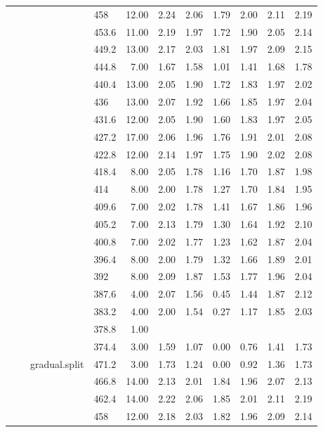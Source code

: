 \begin{longtable}{llllrrrrrrr}
   &  &  & 458 & 12.00 & 2.24 & 2.06 & 1.79 & 2.00 & 2.11 & 2.19 \\ 
   &  &  & 453.6 & 11.00 & 2.19 & 1.97 & 1.72 & 1.90 & 2.05 & 2.14 \\ 
   &  &  & 449.2 & 13.00 & 2.17 & 2.03 & 1.81 & 1.97 & 2.09 & 2.15 \\ 
   &  &  & 444.8 & 7.00 & 1.67 & 1.58 & 1.01 & 1.41 & 1.68 & 1.78 \\ 
   &  &  & 440.4 & 13.00 & 2.05 & 1.90 & 1.72 & 1.83 & 1.97 & 2.02 \\ 
   &  &  & 436 & 13.00 & 2.07 & 1.92 & 1.66 & 1.85 & 1.97 & 2.04 \\ 
   &  &  & 431.6 & 12.00 & 2.05 & 1.90 & 1.60 & 1.83 & 1.97 & 2.05 \\ 
   &  &  & 427.2 & 17.00 & 2.06 & 1.96 & 1.76 & 1.91 & 2.01 & 2.08 \\ 
   &  &  & 422.8 & 12.00 & 2.14 & 1.97 & 1.75 & 1.90 & 2.02 & 2.08 \\ 
   &  &  & 418.4 & 8.00 & 2.05 & 1.78 & 1.16 & 1.70 & 1.87 & 1.98 \\ 
   &  &  & 414 & 8.00 & 2.00 & 1.78 & 1.27 & 1.70 & 1.84 & 1.95 \\ 
   &  &  & 409.6 & 7.00 & 2.02 & 1.78 & 1.41 & 1.67 & 1.86 & 1.96 \\ 
   &  &  & 405.2 & 7.00 & 2.13 & 1.79 & 1.30 & 1.64 & 1.92 & 2.10 \\ 
   &  &  & 400.8 & 7.00 & 2.02 & 1.77 & 1.23 & 1.62 & 1.87 & 2.04 \\ 
   &  &  & 396.4 & 8.00 & 2.00 & 1.79 & 1.32 & 1.66 & 1.89 & 2.01 \\ 
   &  &  & 392 & 8.00 & 2.09 & 1.87 & 1.53 & 1.77 & 1.96 & 2.04 \\ 
   &  &  & 387.6 & 4.00 & 2.07 & 1.56 & 0.45 & 1.44 & 1.87 & 2.12 \\ 
   &  &  & 383.2 & 4.00 & 2.00 & 1.54 & 0.27 & 1.17 & 1.85 & 2.03 \\ 
   &  &  & 378.8 & 1.00 &  &  &  &  &  &  \\ 
   &  &  & 374.4 & 3.00 & 1.59 & 1.07 & 0.00 & 0.76 & 1.41 & 1.73 \\ 
   &  & gradual.split & 471.2 & 3.00 & 1.73 & 1.24 & 0.00 & 0.92 & 1.36 & 1.73 \\ 
   &  &  & 466.8 & 14.00 & 2.13 & 2.01 & 1.84 & 1.96 & 2.07 & 2.13 \\ 
   &  &  & 462.4 & 14.00 & 2.22 & 2.06 & 1.85 & 2.01 & 2.11 & 2.19 \\ 
   &  &  & 458 & 12.00 & 2.18 & 2.03 & 1.82 & 1.96 & 2.09 & 2.14 \\ 

\end{longtable}

